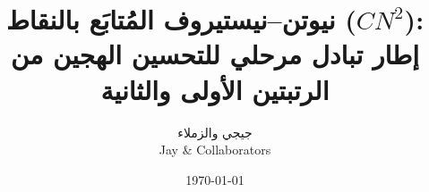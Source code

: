 \documentclass[12pt]{article}

\usepackage{polyglossia}
\usepackage[margin=1in]{geometry}
\usepackage{amsmath,amssymb,amsthm}
\usepackage{booktabs}
\usepackage{graphicx}
\usepackage{hyperref}
\usepackage[ruled,vlined]{algorithm2e}
\usepackage{xcolor}
\usepackage{float}
\usepackage{enumitem}

\setmainlanguage{arabic}
\newfontfamily{}
\newfontfamily{}


\newtheorem{theorem}{نظرية}
\newtheorem{lemma}{تمهيدية}
\newtheorem{definition}{تعريف}
\newtheorem{assumption}{افتراض}

\newcommand{\R}{\mathbb{R}}
\newcommand{\lam}{\lambda}
\newcommand{\grad}{\nabla}
\newcommand{\cn}{CN^2}

\title{\textbf{نيوتن--نيستيروف المُتابَع بالنقاط ($\cn$):\\ إطار تبادل مرحلي للتحسين الهجين من الرتبتين الأولى والثانية}}
\author{جيجي\; والزملاء\\[2mm]{\textenglish{Jay \& Collaborators}}}
\date{\today}


\maketitle

\begin{abstract}
نقترح إطار تبادل مرحلي اسمه \emph{نيوتن--نيستيروف المُتابَع بالنقاط} ($\cn$)، يتناوب بين
طور \emph{تدرّج نيستيروف المتسارع} (NAG) الخام وطور \emph{نيوتن} المحلي. بدل أن نمزج الزخم
بمعلومات الإنحناء باستمرار (كما في أساليب نيوتن التكعيبية القصورية الحديثة)، يؤدّي $\cn$
تبديلاً \emph{قسريّاً}: عندما يدل انحطاط نيوتن $\lam(x)$ على تجاوز حوض الحلّ، نتنقّل بخطوات
متسارعة رخيصة من الرتبة الأولى؛ وعندما يهبط الانحطاط دون عتبة المستخدم $\tau$، نلتزم
بنيوتن المُخمّد للحصول على تقارُب تربيعي محلي. في المناطق غير المحدّبة حيث لا يكون
هيسيان موجب التحدد، نلجأ إلى بوابة معيار التدرج، مما يجعل الطريقة قوية على دوالّ مثل
Rosenbrock وBeale حيث يفشل نيوتن الخام فجأة. في مجموعة من المسائل الاختبارية يتقارب $\cn$
في كل حالة، بما فيها Rosenbrock في البعد $n=200$ حيث يعلَّق كلٌّ من نيوتن وNewton-CG وL-BFGS،
مع عدد مماثل أو أقل من تقييمات الهيسيان. الطريقة متينة على الوسيط المستخدم $K_0$ (طول
الوثبة) وتكشف مفاضلة دقة-تكلفة نظيفة في العتبة $\tau$.
\end{abstract}

